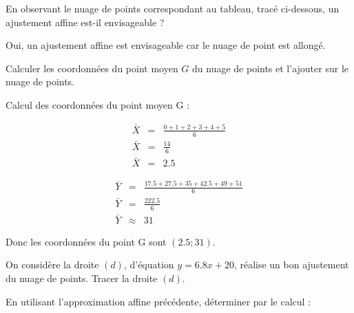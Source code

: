 \begin{questions}
	\question[1] En observant le nuage de points correspondant au tableau, tracé ci-dessous, un ajustement affine est-il envisageable ?
	\begin{solution}
		Oui, un ajustement affine est envisageable car le nuage de point est allongé.
	\end{solution}
	
	\question[1\half] Calculer les coordonnées du point moyen $G$ du nuage de points et l'ajouter sur le nuage de points.
	\begin{solution}
		Calcul des coordonnées du point moyen G :
		
		\begin{eqnarray*}
			\bar{X} &=& \frac{0 + 1 + 2 + 3 + 4 + 5 }{6}\\
			\bar{X} &=& \frac{14}{6}\\
			\bar{X} &=& \num{2.5}
		\end{eqnarray*}
	
		\begin{eqnarray*}
			\bar{Y} &=& \frac{\num{17.5} + \num{27.5} + 35 + \num{42.5} + 49 + 51 }{6}\\
			\bar{Y} &=& \frac{\num{222.5}}{6}\\
			\bar{Y} &\approx& 31			
		\end{eqnarray*}
	
		Donc les coordonnées du point G sont $(\num{2.5}; 31)$.
	\end{solution}
	
	\question[2] On considère la droite $(d)$, d'équation $y = \num{6.8} x + 20$, réalise un bon ajustement du nuage de points. Tracer la droite $(d)$.
	
	\question En utilisant l'approximation affine précédente, déterminer par le calcul :
\end{questions}

